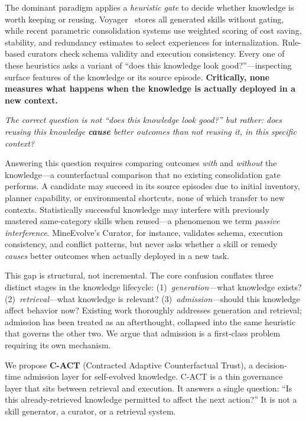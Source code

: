 \documentclass[letterpaper]{article}
\begin{document}
The dominant paradigm applies a \emph{heuristic gate} to decide whether knowledge is worth keeping or reusing. Voyager~\cite{voyager2023} stores all generated skills without gating, while recent parametric consolidation systems use weighted scoring of cost saving, stability, and redundancy estimates to select experiences for internalization. Rule-based curators check schema validity and execution consistency. Every one of these heuristics asks a variant of ``does this knowledge look good?''---inspecting surface features of the knowledge or its source episode. \textbf{Critically, none measures what happens when the knowledge is actually deployed in a new context.}

\emph{The correct question is not ``does this knowledge look good?'' but rather: does reusing this knowledge \textbf{cause} better outcomes than not reusing it, in this specific context?}

Answering this question requires comparing outcomes \emph{with} and \emph{without} the knowledge---a counterfactual comparison that no existing consolidation gate performs. A candidate may succeed in its source episodes due to initial inventory, planner capability, or environmental shortcuts, none of which transfer to new contexts. Statistically successful knowledge may interfere with previously mastered same-category skills when reused---a phenomenon we term \emph{passive interference}. MineEvolve's Curator, for instance, validates schema, execution consistency, and conflict patterns, but never asks whether a skill or remedy \emph{causes} better outcomes when actually deployed in a new task.

This gap is structural, not incremental. The core confusion conflates three distinct stages in the knowledge lifecycle: (1)~\emph{generation}---what knowledge exists? (2)~\emph{retrieval}---what knowledge is relevant? (3)~\emph{admission}---should this knowledge affect behavior now? Existing work thoroughly addresses generation and retrieval; admission has been treated as an afterthought, collapsed into the same heuristic that governs the other two. We argue that admission is a first-class problem requiring its own mechanism.

We propose \textbf{\textsc{C-ACT}} (Contracted Adaptive Counterfactual Trust), a decision-time admission layer for self-evolved knowledge. \textsc{C-ACT} is a thin governance layer that sits between retrieval and execution. It answers a single question: ``Is this already-retrieved knowledge permitted to affect the next action?'' It is not a skill generator, a curator, or a retrieval system.
\end{document}
